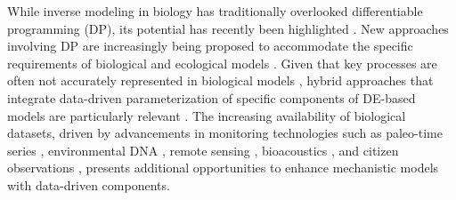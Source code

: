 While inverse modeling in biology has traditionally overlooked differentiable programming (DP), its potential has recently been highlighted \cite{frank2022, alsos2023}. New approaches involving DP are increasingly being proposed to accommodate the specific requirements of biological and ecological models \cite{Yazdani2020, Boussange2024, paredes2023}. Given that key processes are often not accurately represented in biological models \cite{hartig2012, Schartau2017, chalmandrier2021}, hybrid approaches that integrate data-driven parameterization of specific components of DE-based models are particularly relevant \cite{ramsay1996principal, cao2008estimating, paul2011semiparametric, chen2017network, rasp2018, dai2022kernel, Boussange2024}.
The increasing availability of biological datasets, driven by advancements in monitoring technologies such as paleo-time series \cite{alsos2023}, environmental DNA \cite{Ruppert2019}, remote sensing \cite{Jetz2019}, bioacoustics \cite{Aide2013}, and citizen observations \cite{GBIF}, presents additional opportunities to enhance mechanistic models with data-driven components.
